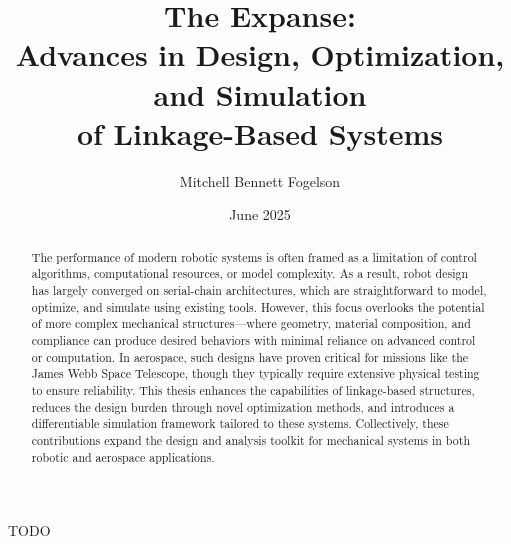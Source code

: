 \documentclass[12pt]{cmuthesis}
\begin{document}
\frontmatter

\pagestyle{empty}

\title{{\bf The Expanse: \\Advances in Design, Optimization, \\ and Simulation\\ of Linkage-Based Systems}}
\author{Mitchell Bennett Fogelson}
\date{June 2025}


\support{}
\disclaimer{}


\maketitle

\begin{dedication}
  TODO
\end{dedication}

\begin{abstract}
The performance of modern robotic systems is often framed as a limitation of control algorithms, computational resources, or model complexity. As a result, robot design has largely converged on serial-chain architectures, which are straightforward to model, optimize, and simulate using existing tools. However, this focus overlooks the potential of more complex mechanical structures—where geometry, material composition, and compliance can produce desired behaviors with minimal reliance on advanced control or computation. In aerospace, such designs have proven critical for missions like the James Webb Space Telescope, though they typically require extensive physical testing to ensure reliability. This thesis enhances the capabilities of linkage-based structures, reduces the design burden through novel optimization methods, and introduces a differentiable simulation framework tailored to these systems. Collectively, these contributions expand the design and analysis toolkit for mechanical systems in both robotic and aerospace applications.
\end{abstract}
\end{document}
